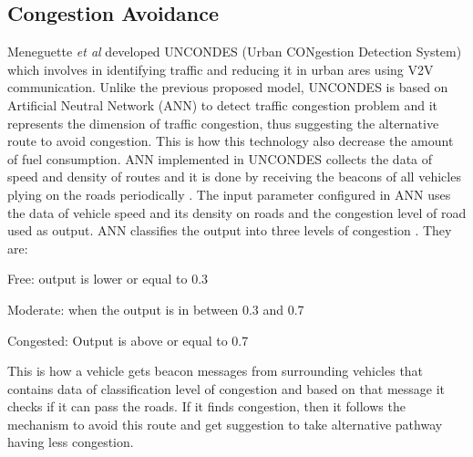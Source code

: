 \documentclass[conference]{IEEEtran}
\begin{document}
\subsection{Congestion Avoidance}
Meneguette \textit{et al} \cite{meneguetteenhancing} developed UNCONDES (Urban CONgestion Detection System) which involves in identifying traffic and reducing it in urban ares using V2V communication. Unlike the previous proposed model, UNCONDES is based on Artificial Neutral Network (ANN) to detect traffic congestion problem and it represents the dimension of traffic congestion, thus suggesting the  alternative route to avoid congestion. This is how this technology also decrease the amount of fuel consumption. ANN implemented in UNCONDES collects the data of speed and density of routes and it is done by receiving the beacons of all vehicles plying on the roads periodically \cite{yousefi2006vehicular}. The input parameter configured in ANN uses the data of vehicle speed and its density on roads and the congestion level of road used as output. ANN classifies the output into three levels of congestion \cite{meneguetteenhancing}. They are: 

Free: output is lower or equal to 0.3

Moderate: when the output is in between 0.3 and 0.7

Congested: Output is above or equal to 0.7


This is how a vehicle gets beacon messages from surrounding vehicles that contains data of classification level of congestion and based on that message it checks if it can pass the roads. If it finds congestion, then it follows the mechanism to avoid this route and get suggestion to take alternative pathway having less congestion.
\end{document}
